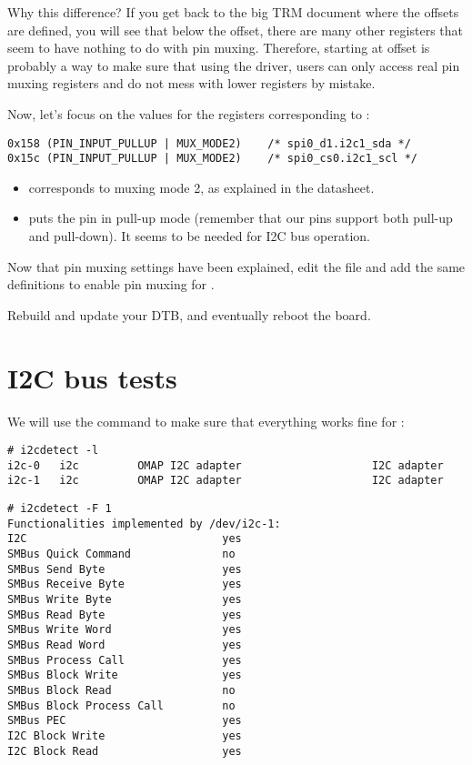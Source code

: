 Why this difference? If you get back to the big TRM document where
the offsets are defined, you will see that below the 
offset, there are many other registers that seem to have nothing to do with
pin muxing. Therefore, starting at offset  is probably
a way to make sure that using the  driver, users
can only access real pin muxing registers and do not mess with lower
registers by mistake.

Now, let's focus on the values for the registers corresponding
to :

\begin{verbatim}
0x158 (PIN_INPUT_PULLUP | MUX_MODE2)    /* spi0_d1.i2c1_sda */
0x15c (PIN_INPUT_PULLUP | MUX_MODE2)    /* spi0_cs0.i2c1_scl */
\end{verbatim}

\begin{itemize}
\item {} corresponds to muxing mode 2, as explained in the
      datasheet.
\item {} puts the pin in pull-up mode (remember
      that our pins support both pull-up and pull-down). It seems to
      be needed for I2C bus operation.
\end{itemize}

Now that pin muxing settings have been explained, edit the
 file and add
the same definitions to enable pin muxing for .

Rebuild and update your DTB, and eventually reboot the board.

\section{I2C bus tests}

We will use the  command to make sure that 
everything works fine for :

\begin{verbatim}
# i2cdetect -l
i2c-0	i2c       	OMAP I2C adapter                	I2C adapter
i2c-1	i2c       	OMAP I2C adapter                	I2C adapter
\end{verbatim}

\begin{verbatim}
# i2cdetect -F 1
Functionalities implemented by /dev/i2c-1:
I2C                              yes
SMBus Quick Command              no
SMBus Send Byte                  yes
SMBus Receive Byte               yes
SMBus Write Byte                 yes
SMBus Read Byte                  yes
SMBus Write Word                 yes
SMBus Read Word                  yes
SMBus Process Call               yes
SMBus Block Write                yes
SMBus Block Read                 no
SMBus Block Process Call         no
SMBus PEC                        yes
I2C Block Write                  yes
I2C Block Read                   yes
\end{verbatim}

